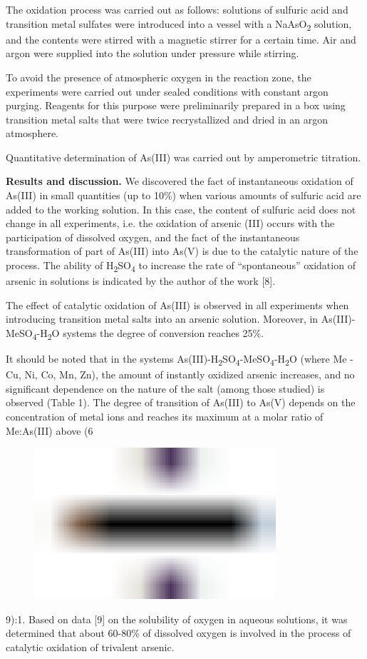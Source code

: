 The oxidation process was carried out as follows: solutions of sulfuric
acid and transition metal sulfates were introduced into a vessel with a
NaAsO\textsubscript{2} solution, and the contents were stirred with a
magnetic stirrer for a certain time. Air and argon were supplied into
the solution under pressure while stirring.

To avoid the presence of atmospheric oxygen in the reaction zone, the
experiments were carried out under sealed conditions with constant argon
purging. Reagents for this purpose were preliminarily prepared in a box
using transition metal salts that were twice recrystallized and dried in
an argon atmosphere.

Quantitative determination of As(III) was carried out by amperometric
titration.

{\bfseries Results and discussion.} We discovered the fact of instantaneous
oxidation of As(III) in small quantities (up to 10\%) when various
amounts of sulfuric acid are added to the working solution. In this
case, the content of sulfuric acid does not change in all experiments,
i.e. the oxidation of arsenic (III) occurs with the participation of
dissolved oxygen, and the fact of the instantaneous transformation of
part of As(III) into As(V) is due to the catalytic nature of the
process. The ability of H\textsubscript{2}SO\textsubscript{4} to
increase the rate of ``spontaneous'' oxidation of arsenic in solutions
is indicated by the author of the work {[}8{]}.

The effect of catalytic oxidation of As(III) is observed in all
experiments when introducing transition metal salts into an arsenic
solution. Moreover, in As(III)-MeSO\textsubscript{4}-H\textsubscript{2}O
systems the degree of conversion reaches 25\%.

It should be noted that in the systems
As(III)-H\textsubscript{2}SO\textsubscript{4}-MeSO\textsubscript{4}-H\textsubscript{2}O
(where Me - Cu, Ni, Co, Mn, Zn), the amount of instantly oxidized
arsenic increases, and no significant dependence on the nature of the
salt (among those studied) is observed (Table 1). The degree of
transition of As(III) to As(V) depends on the concentration of metal
ions and reaches its maximum at a molar ratio of Me:As(III) above
(6\begin{figure}[H]
	\centering
	\includegraphics[width=0.8\textwidth]{assets/329}
	\caption*{}
\end{figure}9):1.
Based on data {[}9{]} on the solubility of oxygen in aqueous solutions,
it was determined that about 60-80\% of dissolved oxygen is involved in
the process of catalytic oxidation of trivalent arsenic.

